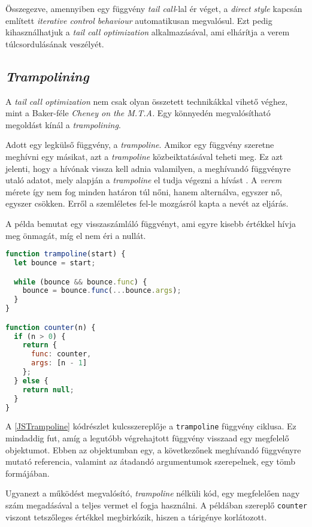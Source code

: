 Összegezve, amennyiben egy függvény \textit{tail call}-lal ér véget, a \textit{direct style} kapcsán említett \textit{iterative control behaviour} automatikusan megvalósul. Ezt pedig kihasználhatjuk a \textit{tail call optimization} alkalmazásával, ami elhárítja a verem túlcsordulásának veszélyét.

\subsection{\textit{Trampolining}}

 A \textit{tail call optimization} nem csak olyan összetett technikákkal vihető véghez, mint a Baker-féle \textit{Cheney on the M.T.A.} Egy könnyedén megvalósítható megoldást kínál a \textit{trampolining}.

 Adott egy legkülső függvény, a \textit{trampoline}. Amikor egy függvény szeretne meghívni egy másikat, azt a \textit{trampoline} közbeiktatásával teheti meg. Ez azt jelenti, hogy a hívónak vissza kell adnia valamilyen, a meghívandó függvényre utaló adatot, mely alapján a \textit{trampoline} el tudja végezni a hívást \cite{Schinz2001}. A \textit{verem} mérete így nem fog minden határon túl nőni, hanem alternálva, egyszer nő, egyszer csökken. Erről a szemléletes fel-le mozgásról kapta a nevét az eljárás.

 A példa bemutat egy visszaszámláló függvényt, ami egyre kisebb értékkel hívja meg önmagát, míg el nem éri a nullát.

\begin{lstlisting}[language=JavaScript, caption={\textit{Trampolining} megvalósítása \textit{JavaScript}ben}, captionpos=b, label=JSTrampoline]
function trampoline(start) {
  let bounce = start;

  while (bounce && bounce.func) {
    bounce = bounce.func(...bounce.args);
  }
}

function counter(n) {
  if (n > 0) {
    return { 
      func: counter, 
      args: [n - 1]
    };
  } else {
    return null;
  }
}
\end{lstlisting}
 
 A \ref{JSTrampoline} kódrészlet kulcsszereplője a \texttt{trampoline} függvény ciklusa. Ez mindaddig fut, amíg a legutóbb végrehajtott függvény visszaad egy megfelelő objektumot. Ebben az objektumban egy, a következőnek meghívandó függvényre mutató referencia, valamint az átadandó argumentumok szerepelnek, egy tömb formájában.

 Ugyanezt a működést megvalósító, \textit{trampoline} nélküli kód, egy megfelelően nagy szám megadásával a teljes vermet el fogja használni. A példában szereplő \texttt{counter} viszont tetszőleges értékkel megbirkózik, hiszen a tárigénye korlátozott.